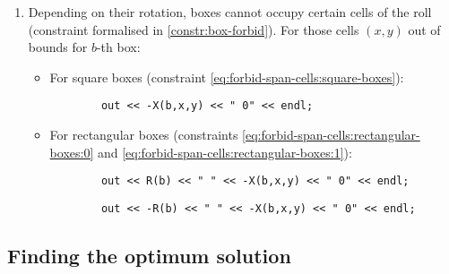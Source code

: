 \begin{enumerate}
	\item Depending on their rotation, boxes cannot occupy certain cells of the
	roll (constraint formalised in \ref{constr:box-forbid}). For those cells $(x,y)$
	out of bounds for $b$-th box:
    
	\begin{itemize}
		\item For square boxes (constraint \ref{eq:forbid-span-cells:square-boxes}):
		{\NOINDENT \begin{lstlisting}
		out << -X(b,x,y) << " 0" << endl;
		\end{lstlisting}}
		
		\item For rectangular boxes (constraints \ref{eq:forbid-span-cells:rectangular-boxes:0}
		and \ref{eq:forbid-span-cells:rectangular-boxes:1}):
		{\NOINDENT \begin{lstlisting}
		out << R(b) << " " << -X(b,x,y) << " 0" << endl;
		\end{lstlisting}}
		{\NOINDENT \begin{lstlisting}
		out << -R(b) << " " << -X(b,x,y) << " 0" << endl;
		\end{lstlisting}}
	\end{itemize}
    
\end{enumerate}

\subsection{Finding the optimum solution}
\label{sec:satisfiability:optimum}

